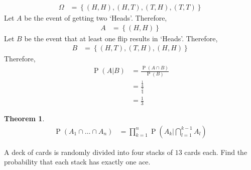 \documentclass[titlepage, fleqn, a4paper, 12pt, twoside]{article}
\theoremstyle{definition}
\theoremstyle{theorem}
\newtheorem{theorem}{Theorem}
\DeclareMathOperator{\prob}{\mathrm{P}}
\begin{document}
\begin{solution}
	\begin{align*}
		\Omega & = \left\{ (H,H),(H,T),(T,H),(T,T) \right\}
	\end{align*}
	Let $A$ be the event of getting two `Heads'.
	Therefore,
	\begin{align*}
		A & = \left\{ (H,H) \right\}
	\end{align*}
	Let $B$ be the event that at least one flip results in `Heads'.
	Therefore,
	\begin{align*}
		B & = \left\{ (H,T),(T,H),(H,H) \right\}
	\end{align*}
	Therefore,
	\begin{align*}
		\prob(A|B) & = \frac{\prob(A \cap B)}{\prob(B)} \\
                           & = \frac{\frac{1}{4}}{\frac{3}{4}}  \\
                           & = \frac{1}{3}
	\end{align*}
\end{solution}

\begin{theorem}
	\begin{align*}
		\prob(A_1 \cap \dots \cap A_n) & = \prod\limits_{k = 1}^{n} \prob\left( A_k | \bigcap\limits_{l = 1}^{k - 1} A_l \right)
	\end{align*}
\end{theorem}

\begin{question}
	A deck of cards is randomly divided into four stacks of $13$ cards each.
	Find the probability that each stack has exactly one ace.
\end{question}
\end{document}
